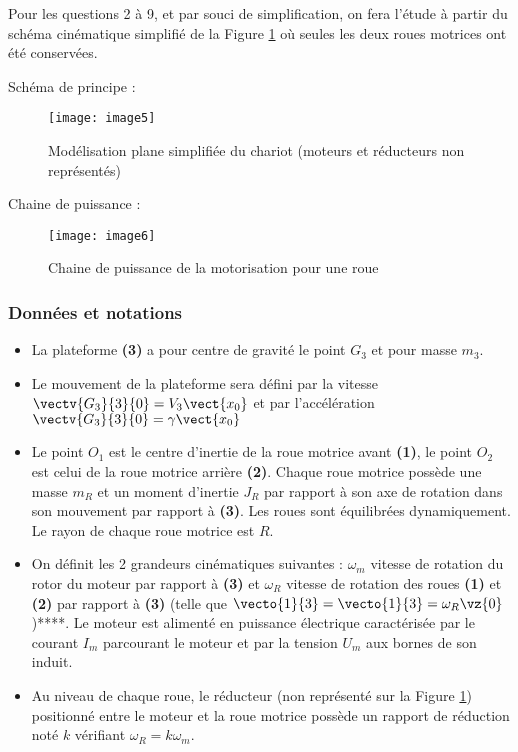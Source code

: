Pour les questions 2 à 9, et par souci de simplification, on fera l'étude à partir du schéma cinématique simplifié de la Figure \ref{fig:CCMP:2021:05} où seules les deux roues motrices ont été conservées.

Schéma de principe : 
\begin{figure}[!h]
\centering
\texttt{[image: image5]}
\caption{ \label{fig:CCMP:2021:05} Modélisation plane simplifiée du chariot (moteurs et réducteurs non représentés)}
\end{figure} 

Chaine de puissance :
\begin{figure}[!h]
\centering
\texttt{[image: image6]}
\caption{ \label{fig:CCMP:2021:06} Chaine de puissance de la motorisation pour une roue}
\end{figure} 
 



\subsubsection*{Données et notations}
\begin{itemize}
     \item La plateforme \textbf{(3)} a pour centre de gravité le point $G_3$ et pour masse $m_3$.
     \item Le mouvement de la plateforme sera défini par la vitesse $\vectv{G_3}{3}{0}=  V_3\vect{x_0}$ et par l'accélération $\vectv{G_3}{3}{0}=  \gamma \vect{x_0}$
     \item Le point $O_1$ est le centre d’inertie de la roue motrice avant \textbf{(1)}, le point $O_2$ est celui de la roue motrice arrière \textbf{(2)}. Chaque roue motrice possède une masse $m_R$ et un moment d'inertie $J_R$ par rapport à son axe de rotation dans son mouvement par rapport à \textbf{(3)}. Les roues sont équilibrées dynamiquement. Le rayon de chaque roue motrice est $R$.
     \item On définit les 2 grandeurs cinématiques suivantes : $\omega_m$ vitesse de rotation du rotor du moteur par rapport à \textbf{(3)} et $\omega_R$ vitesse de rotation des roues \textbf{(1)} et \textbf{(2)} par rapport à \textbf{(3)} (telle que $\vecto{1}{3}=\vecto{1}{3}=\omega_R \vz{0}$)****. Le moteur est alimenté en puissance électrique caractérisée par le courant $I_m$ parcourant le moteur et par la tension $U_m$ aux bornes de son induit.
     \item Au niveau de chaque roue, le réducteur (non représenté sur la Figure \ref{fig:CCMP:2021:05}) positionné entre le moteur et la roue motrice possède un rapport de réduction noté $k$ vérifiant $\omega_R= k \omega_m$.
\end{itemize}

